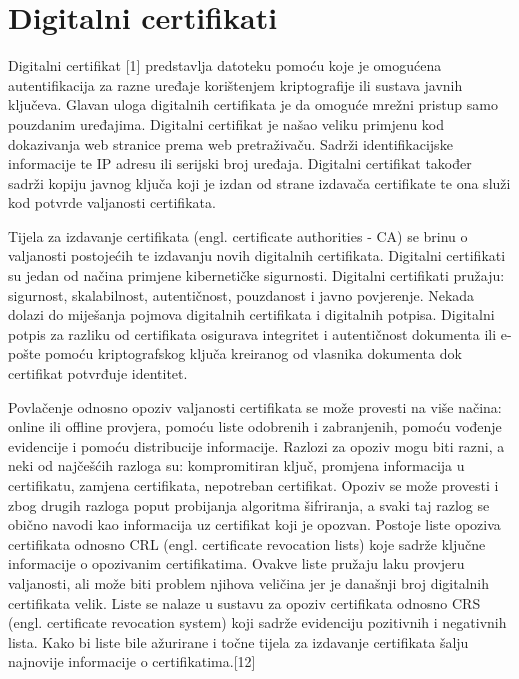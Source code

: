 \documentclass[]{foi}
\begin{document}
\chapter{Digitalni certifikati}

Digitalni certifikat [1] predstavlja datoteku pomoću koje je omogućena autentifikacija za razne uređaje korištenjem kriptografije ili sustava javnih ključeva.
Glavan uloga digitalnih certifikata je da omoguće mrežni pristup samo pouzdanim uređajima.
Digitalni certifikat je našao veliku primjenu kod dokazivanja web stranice prema web pretraživaču.
Sadrži identifikacijske informacije te IP adresu ili serijski broj uređaja.
Digitalni certifikat također sadrži kopiju javnog ključa koji je izdan od strane izdavača certifikate te ona služi kod potvrde valjanosti certifikata.

Tijela za izdavanje certifikata (engl. certificate authorities - CA) se brinu o valjanosti postojećih te izdavanju novih digitalnih certifikata.
Digitalni certifikati su jedan od načina primjene kibernetičke sigurnosti.
Digitalni certifikati pružaju: sigurnost, skalabilnost, autentičnost, pouzdanost i javno povjerenje.
Nekada dolazi do miješanja pojmova digitalnih certifikata i digitalnih potpisa.
Digitalni potpis za razliku od certifikata osigurava integritet i autentičnost dokumenta ili e-pošte pomoću kriptografskog ključa kreiranog od vlasnika dokumenta dok certifikat potvrđuje identitet.

Povlačenje odnosno opoziv valjanosti certifikata se može provesti na više načina: online ili offline provjera, pomoću liste odobrenih i zabranjenih, pomoću vođenje evidencije i pomoću distribucije informacije.
Razlozi za opoziv mogu biti razni, a neki od najčešćih razloga su: kompromitiran ključ, promjena informacija u certifikatu, zamjena certifikata, nepotreban certifikat.
Opoziv se može provesti i zbog drugih razloga poput probijanja algoritma šifriranja, a svaki taj razlog se obično navodi kao informacija uz certifikat koji je opozvan.
Postoje liste opoziva certifikata odnosno CRL (engl. certificate revocation lists) koje sadrže ključne informacije o opozivanim certifikatima.
Ovakve liste pružaju laku provjeru valjanosti, ali može biti problem njihova veličina jer je današnji broj digitalnih certifikata velik.
Liste se nalaze u sustavu za opoziv certifikata odnosno CRS (engl. certificate revocation system) koji sadrže evidenciju pozitivnih i negativnih lista.
Kako bi liste bile ažurirane i točne tijela za izdavanje certifikata šalju najnovije informacije o certifikatima.[12]
\end{document}
